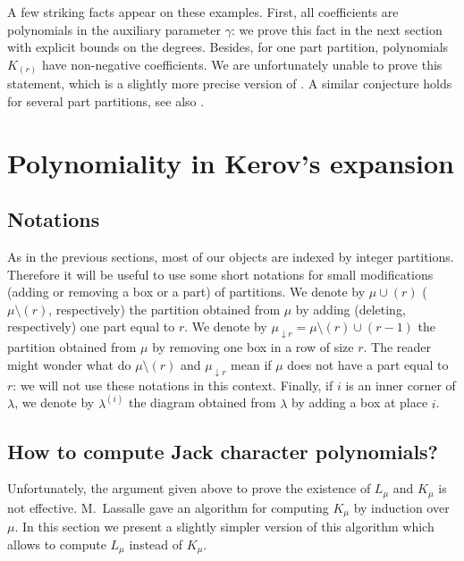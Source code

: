 \documentclass[11pt]{amsart}
\theoremstyle{plain}
\theoremstyle{remark}
\begin{document}
A few striking facts appear on these examples. First, all coefficients are polynomials in the auxiliary parameter $\gamma$:
        we prove this fact in the next section with explicit bounds on the 
        degrees.
    Besides, for one part partition, polynomials $K_{(r)}$ 
        have non-negative coefficients.
        We are unfortunately unable to prove this statement, which is a slightly more
        precise version of \cite[Conjecture 1.2]{Lassalle2009}.
        A similar conjecture holds for several part partitions,
        see also \cite[Conjecture 1.2]{Lassalle2009}.

\section{Polynomiality in Kerov's expansion}
\label{SectPolynomial}
\subsection{Notations}
As in the previous sections, most of our objects are indexed by integer partitions.
Therefore it will be useful to use some short notations for small modifications
(adding or removing a box or a part) of partitions.
We denote by $\mu \cup (r)$ ($\mu \setminus (r)$, respectively)
the partition obtained from $\mu$ by adding  (deleting, respectively)
one part equal to $r$.
We denote by $\mu_{\downarrow r}=\mu \setminus (r) \cup (r-1)$ the partition
obtained from $\mu$ by removing one box in a row of size $r$.
The reader might wonder what do $\mu \setminus (r)$ and $\mu_{\downarrow r}$ mean
if $\mu$ does not have a part equal to $r$:
we will not use these notations in this context.
Finally, if $i$ is an inner corner of $\lambda$,
we denote by $\lambda^{(i)}$ the diagram obtained from $\lambda$ by adding a box
at place $i$.

\subsection{How to compute Jack character polynomials?}
\label{SubsectAlgo}
Unfortunately, the argument given above to prove the existence of $L_\mu$
and $K_\mu$ is not effective.
M.~Lassalle \cite{Lassalle2009} gave an algorithm for computing $K_\mu$
by induction over $\mu$.
In this section we present a slightly simpler version of this algorithm which allows to compute
$L_\mu$ instead of $K_\mu$.
\end{document}
